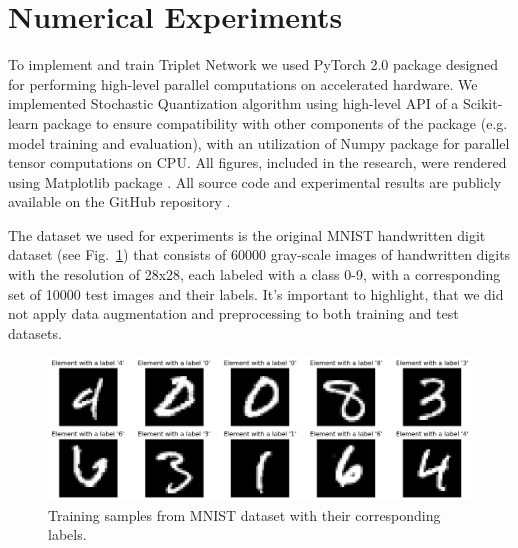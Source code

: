 \section{Numerical Experiments}

To implement and train Triplet Network we used PyTorch 2.0 package \cite{Ansel_2024} designed for performing high-level parallel computations on accelerated hardware. We implemented Stochastic Quantization algorithm using high-level API of a Scikit-learn package \cite{Pedregosa_2011} to ensure compatibility with other components of the package (e.g. model training and evaluation), with an utilization of Numpy package \cite{harris2020array} for parallel tensor computations on CPU. All figures, included in the research, were rendered using Matplotlib package \cite{Hunter_2007}. All source code and experimental results are publicly available on the GitHub repository \cite{Kozyriev_2024}.

The dataset we used for experiments is the original MNIST handwritten digit dataset \cite{lecun2010mnist} (see Fig.~\ref{mnist:fig}) that consists of 60000 gray-scale images of handwritten digits with the resolution of 28x28, each labeled with a class 0-9, with a corresponding set of 10000 test images and their labels. It's important to highlight, that we did not apply data augmentation and preprocessing to both training and test datasets.

\begin{figure}
    \centering
    \includegraphics[width=\textwidth]{figures/dataset.png}
    \caption{Training samples from MNIST dataset \cite{lecun2010mnist} with their corresponding labels.} \label{mnist:fig}
\end{figure}

